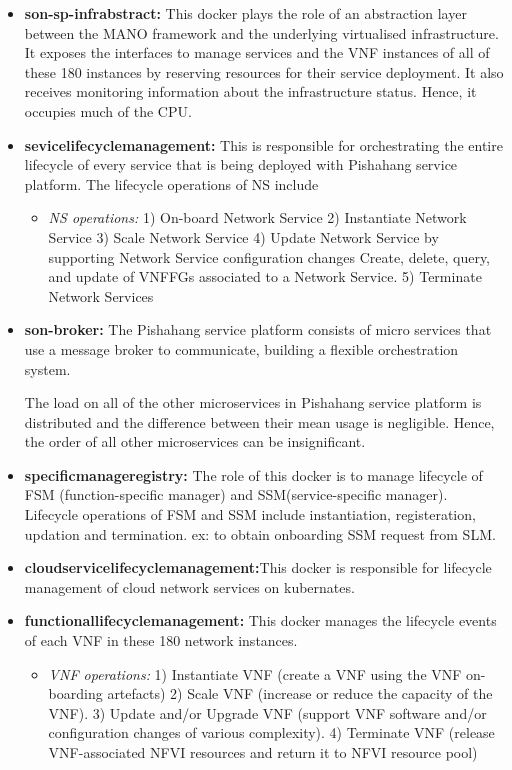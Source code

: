 \begin{itemize}
	\item \textbf{son-sp-infrabstract:} This docker plays the role of an abstraction layer between the MANO framework and the underlying virtualised infrastructure. It exposes the interfaces to manage services and the VNF instances of all of these 180 instances by reserving resources for their service deployment. It also receives monitoring information about the infrastructure status. Hence, it occupies much of the CPU.
	\item \textbf{sevicelifecyclemanagement:} This is responsible for orchestrating the entire lifecycle of every service that is being deployed with Pishahang service platform. The lifecycle operations of NS include
	
	\begin{itemize}
		\item \textit{NS operations:} 
		1) On-board Network Service
		2) Instantiate Network Service
		3) Scale Network Service
		4) Update Network Service by supporting Network Service configuration changes
		Create, delete, query, and update of VNFFGs associated to a Network Service.
		5) Terminate Network Services
		
	\end{itemize}

	\item \textbf{son-broker:} The Pishahang service platform consists of micro services that use a message broker to communicate, building a flexible orchestration system.
	
The load on all of the other microservices in Pishahang service platform is distributed and the difference between their mean usage is negligible. Hence, the order of all other microservices can be insignificant.

	
	\item \textbf{specificmanageregistry:} The role of this docker is to manage lifecycle of FSM (function-specific manager) and SSM(service-specific manager). Lifecycle operations of FSM and SSM include instantiation, registeration, updation and termination. ex: to obtain onboarding SSM request from SLM.
	\item \textbf{cloudservicelifecyclemanagement:}This docker is responsible for lifecycle management of cloud network services on kubernates.
	\item \textbf{functionallifecyclemanagement:}  This docker manages the lifecycle events of each VNF in these 180 network instances. 

\begin{itemize}
		
	\item \textit{VNF operations:} 1) Instantiate VNF (create a VNF using the VNF on-boarding artefacts)
	2) Scale VNF (increase or reduce the capacity of the VNF).
	3) Update and/or Upgrade VNF (support VNF software and/or configuration changes of various complexity).
	4) Terminate VNF (release VNF-associated NFVI resources and return it to NFVI resource pool)
\end{itemize}
	\end{itemize}

